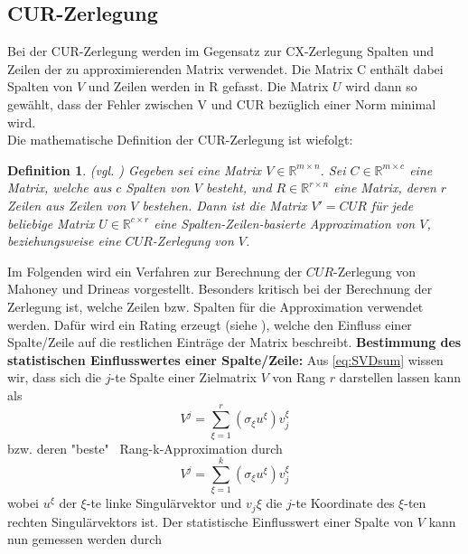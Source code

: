 \documentclass[12pt,a4paper,twoside]{article}
\newtheorem{Definition}[Satz]{Definition}
\begin{document}
	\subsection{CUR-Zerlegung}	
		\label{subsec:CUR}
		Bei der CUR-Zerlegung werden im Gegensatz zur CX-Zerlegung Spalten und Zeilen der zu approximierenden Matrix 
		verwendet. Die Matrix C enthält dabei Spalten von $V$ und Zeilen werden in R gefasst. Die Matrix $U$ wird 
		dann so gewählt, dass der Fehler zwischen V und CUR bezüglich einer Norm minimal wird. \\
		Die mathematische Definition der CUR-Zerlegung ist wiefolgt:
		\begin{Definition}{(vgl. \citep{Drineas2009})}
			Gegeben sei eine Matrix $V\in \mathds{R}^{m\times n}$. Sei $C\in\mathds{R}^{m\times 
			c}$ eine Matrix, welche aus $c$ Spalten von $V$ besteht, und $R\in\mathds{R}^{r\times n}$ eine Matrix, 
			deren $r$ Zeilen aus Zeilen von $V$ bestehen. Dann ist die Matrix $V'=CUR$ für jede beliebige Matrix $U
			\in\mathds{R}^{c\times r}$ eine Spalten-Zeilen-basierte Approximation von $V$, beziehungsweise eine $CUR
			$-Zerlegung von $V$.
		\end{Definition}
		Im Folgenden wird ein Verfahren zur Berechnung der $CUR$-Zerlegung von Mahoney und Drineas \citep{mahoney2008} vorgestellt. \newline
		\newline
		Besonders kritisch bei der Berechnung der Zerlegung ist, welche Zeilen bzw. Spalten für die Approximation 
		verwendet werden.
		Dafür wird ein Rating erzeugt (siehe \citep{mahoney2008}), welche den Einfluss einer Spalte/Zeile auf die 
		restlichen Einträge der Matrix beschreibt. \newline
		\newline	
		\textbf{Bestimmung des statistischen Einflusswertes einer Spalte/Zeile:} \newline 
		Aus \ref{eq:SVDsum} wissen wir, dass sich die $j$-te Spalte einer Zielmatrix $V$ von Rang $r$ darstellen lassen kann als
		\begin{equation*}
			V^j=\sum_{\xi=1}^r(\sigma_\xi u^\xi )v_j^\xi
		\end{equation*}
		bzw. deren "beste" \ Rang-k-Approximation durch
		\begin{equation*}
			V^j=\sum_{\xi=1}^k(\sigma_\xi u^\xi )v_j^\xi
		\end{equation*}
		wobei $u^\xi$ der $\xi$-te linke Singulärvektor und $v_j\xi$ die $j$-te Koordinate des $\xi$-ten rechten 
		Singulärvektors ist. Der statistische Einflusswert einer Spalte von $V$ kann nun gemessen werden durch
\end{document}
